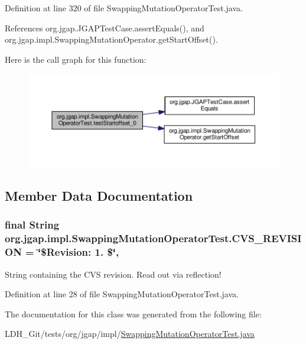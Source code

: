Definition at line 320 of file Swapping\-Mutation\-Operator\-Test.\-java.



References org.\-jgap.\-J\-G\-A\-P\-Test\-Case.\-assert\-Equals(), and org.\-jgap.\-impl.\-Swapping\-Mutation\-Operator.\-get\-Start\-Offset().



Here is the call graph for this function\-:
\nopagebreak
\begin{figure}[H]
\begin{center}
\leavevmode
\includegraphics[width=350pt]{classorg_1_1jgap_1_1impl_1_1_swapping_mutation_operator_test_ad21ac2ce7a69b2efd0b54e0eb38c0f6e_cgraph}
\end{center}
\end{figure}




\subsection{Member Data Documentation}
\hypertarget{classorg_1_1jgap_1_1impl_1_1_swapping_mutation_operator_test_a9872aab6676e6549c1325276b748949a}{
\subsubsection[{C\-V\-S\-\_\-\-R\-E\-V\-I\-S\-I\-O\-N}]{\setlength{\rightskip}{0pt plus 5cm}final String org.\-jgap.\-impl.\-Swapping\-Mutation\-Operator\-Test.\-C\-V\-S\-\_\-\-R\-E\-V\-I\-S\-I\-O\-N = \char`\"{}\$Revision\-: 1. \$\char`\"{}\hspace{0.3cm}{\ttfamily [static]}, {\ttfamily [private]}}}\label{classorg_1_1jgap_1_1impl_1_1_swapping_mutation_operator_test_a9872aab6676e6549c1325276b748949a}
String containing the C\-V\-S revision. Read out via reflection! 

Definition at line 28 of file Swapping\-Mutation\-Operator\-Test.\-java.



The documentation for this class was generated from the following file\-:\begin{DoxyCompactItemize}
\item 
L\-D\-H\-\_\-\-Git/tests/org/jgap/impl/\hyperlink{_swapping_mutation_operator_test_8java}{Swapping\-Mutation\-Operator\-Test.\-java}\end{DoxyCompactItemize}
